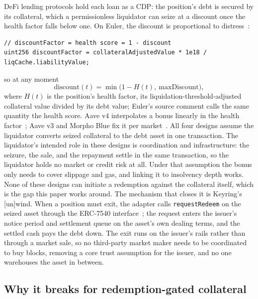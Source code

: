\documentclass[11pt,a4paper]{article}
\begin{document}
DeFi lending protocols hold each loan as a CDP: the position's debt is secured by its collateral, which a permissionless liquidator can seize at a discount once the health factor falls below one. On Euler, the discount is proportional to distress~\cite{eulerdocs}:
\begin{lstlisting}
// discountFactor = health score = 1 - discount
uint256 discountFactor = collateralAdjustedValue * 1e18 / liqCache.liabilityValue;
\end{lstlisting}
so at any moment
\[
\text{discount}(t) = \min\bigl(1 - H(t),\ \text{maxDiscount}\bigr),
\]
where $H(t)$ is the position's health factor, its liquidation-threshold-adjusted collateral value divided by its debt value; Euler's source comment calls the same quantity the health score.
Aave v4 interpolates a bonus linearly in the health factor~\cite{aavedocs}; Aave v3 and Morpho Blue fix it per market~\cite{morpho}. All four designs assume the liquidator converts seized collateral to the debt asset in one transaction. The liquidator's intended role in these designs is coordination and infrastructure: the seizure, the sale, and the repayment settle in the same transaction, so the liquidator holds no market or credit risk at all. Under that assumption the bonus only needs to cover slippage and gas, and linking it to insolvency depth works. None of these designs can initiate a redemption against the collateral itself, which is the gap this paper works around. The mechanism that closes it is Keyring's [un]wind. When a position must exit, the adapter calls \texttt{requestRedeem} on the seized asset through the ERC-7540 interface~\cite{erc7540}; the request enters the issuer's notice period and settlement queue on the asset's own dealing terms, and the settled cash pays the debt down. The exit runs on the issuer's rails rather than through a market sale, so no third-party market maker needs to be coordinated to buy blocks, removing a core trust assumption for the issuer, and no one warehouses the asset in between.

\subsection{Why it breaks for redemption-gated collateral}
\end{document}
